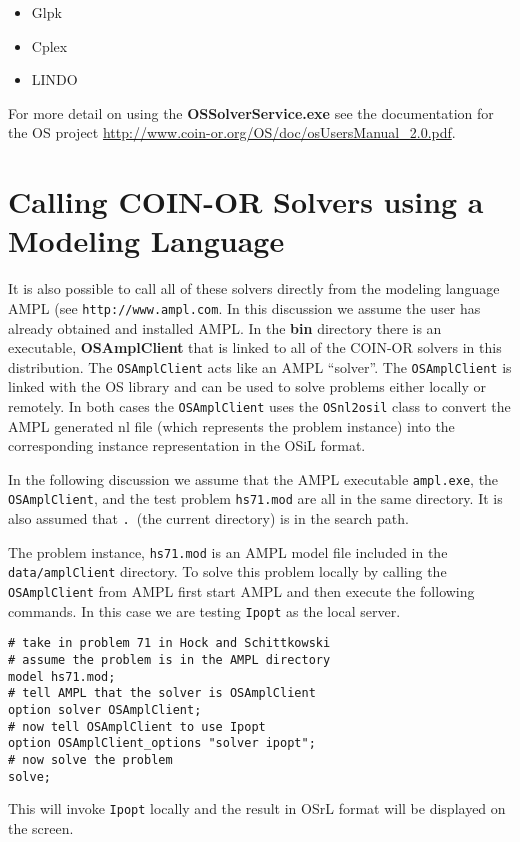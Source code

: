 \documentclass[11pt]{article}
\renewcommand{\_}{{\char"5F}}
\renewcommand{\{}{{\char"7B}}
\renewcommand{\}}{{\char"7D}}
\renewcommand{\^}{{\char"0D}}
\renewcommand{\'}{{\char"0D}}
\begin{document}
\begin{itemize}

 \item Glpk 

 \item Cplex 

 \item LINDO

\end{itemize}


For more detail on using the {\bf OSSolverService.exe} see the documentation for the OS project \url{http://www.coin-or.org/OS/doc/osUsersManual_2.0.pdf}.

\section{Calling COIN-OR  Solvers using a Modeling Language}\label{section:modellanguage}

It is also possible to call all of these solvers directly from the modeling language AMPL 
(see {\tt http://www.ampl.com}.  In this discussion we assume the user has already obtained and 
installed AMPL.  In the {\bf bin} directory there is an executable, {\bf OSAmplClient} 
that is linked to all of the COIN-OR solvers in this distribution.   The {\tt OSAmplClient} acts 
like an AMPL ``solver''. The {\tt OSAmplClient} is linked with the OS library and can be used 
to solve problems either locally or remotely. In both cases the {\tt OSAmplClient} uses the
{\tt OSnl2osil} class to convert the AMPL generated nl 
file (which represents the problem instance) into the corresponding 
instance representation in the OSiL format.

In the following discussion we assume that the AMPL executable {\tt ampl.exe}, the {\tt OSAmplClient}, 
and the test problem {\tt hs71.mod} are all in the same directory.  
It is also assumed that {\tt .}~(the current directory) is in the search path.

The  problem instance, {\tt hs71.mod} is an AMPL model file included in the {\tt data/amplClient} directory.
To solve this problem locally by calling the {\tt OSAmplClient} from AMPL first start AMPL and then
execute the following commands. In this case we are testing  {\tt Ipopt} as the
local server.

\begin{verbatim}
# take in problem 71 in Hock and Schittkowski
# assume the problem is in the AMPL directory
model hs71.mod;
# tell AMPL that the solver is OSAmplClient
option solver OSAmplClient;
# now tell OSAmplClient to use Ipopt
option OSAmplClient_options "solver ipopt";
# now solve the problem
solve;
\end{verbatim}
This will invoke {\tt Ipopt} locally and the result in OSrL format will be displayed on the screen.
\end{document}
